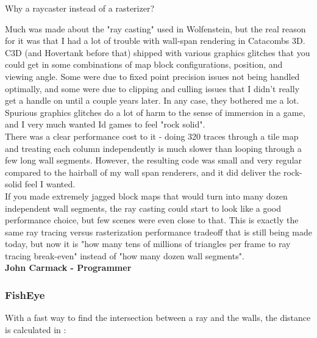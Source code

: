\begin{fancyquotes}
Why a raycaster instead of a rasterizer?\\
\par
Much was made about the "ray casting" used in Wolfenstein, but the real reason for it was that I had a lot of trouble with wall-span rendering in Catacombs 3D.  C3D (and Hovertank before that) shipped with various graphics glitches that you could get in some combinations of map block configurations, position, and viewing angle.  Some were due to fixed point precision issues not being handled optimally, and some were due to clipping and culling issues that I didn't really get a handle on until a couple years later.  In any case, they bothered me a lot.  Spurious graphics glitches do a lot of harm to the sense of immersion in a game, and I very much wanted Id games to feel "rock solid".
 \bigskip \\
There was a clear performance cost to it - doing 320 traces through a tile map and treating each column independently is much slower than looping through a few long wall segments.  However, the resulting code was small and very regular compared to the hairball of my wall span renderers, and it did deliver the rock-solid feel I wanted.
 \bigskip \\
If you made extremely jagged block maps that would turn into many dozen independent wall segments, the ray casting could start to look like a good performance choice, but few scenes were even close to that.  This is exactly the same ray tracing versus rasterization performance tradeoff that is still being made today, but now it is "how many tens of millions of triangles per frame to ray tracing break-even" instead of "how many dozen wall segments".
 \bigskip \\
\textbf{John Carmack - Programmer}
 \end{fancyquotes}











\subsubsection{FishEye}
With a fast way to find the intersection between a ray and the walls, the distance is calculated in :\\

\begin{minipage}{\textwidth}

\end{minipage}

